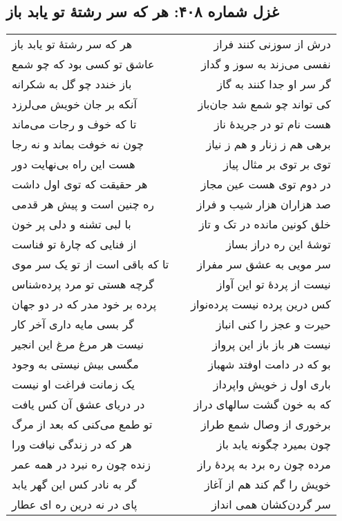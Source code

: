 \begin{center}
\section*{غزل شماره ۴۰۸: هر که سر رشتهٔ تو یابد باز}
\label{sec:408}
\begin{longtable}{l p{0.5cm} r}
هر که سر رشتهٔ تو یابد باز
&&
درش از سوزنی کنند فراز
\\
عاشق تو کسی بود که چو شمع
&&
نفسی می‌زند به سوز و گداز
\\
باز خندد چو گل به شکرانه
&&
گر سر او جدا کنند به گاز
\\
آنکه بر جان خویش می‌لرزد
&&
کی تواند چو شمع شد جان‌باز
\\
تا که خوف و رجات می‌ماند
&&
هست نام تو در جریدهٔ ناز
\\
چون نه خوفت بماند و نه رجا
&&
برهی هم ز زنار و هم ز نیاز
\\
هست این راه بی‌نهایت دور
&&
توی بر توی بر مثال پیاز
\\
هر حقیقت که توی اول داشت
&&
در دوم توی هست عین مجاز
\\
ره چنین است و پیش هر قدمی
&&
صد هزاران هزار شیب و فراز
\\
با لبی تشنه و دلی پر خون
&&
خلق کونین مانده در تک و تاز
\\
از فنایی که چارهٔ تو فناست
&&
توشهٔ این ره دراز بساز
\\
تا که باقی است از تو یک سر موی
&&
سر مویی به عشق سر مفراز
\\
گرچه هستی تو مرد پرده‌شناس
&&
نیست از پردهٔ تو این آواز
\\
پرده بر خود مدر که در دو جهان
&&
کس درین پرده نیست پرده‌نواز
\\
گر بسی مایه داری آخر کار
&&
حیرت و عجز را کنی انباز
\\
نیست هر مرغ مرغ این انجیر
&&
نیست هر باز باز این پرواز
\\
مگسی بیش نیستی به وجود
&&
بو که در دامت اوفتد شهباز
\\
یک زمانت فراغت او نیست
&&
باری اول ز خویش واپرداز
\\
در دریای عشق آن کس یافت
&&
که به خون گشت سالهای دراز
\\
تو طمع می‌کنی که بعد از مرگ
&&
برخوری از وصال شمع طراز
\\
هر که در زندگی نیافت ورا
&&
چون بمیرد چگونه یابد باز
\\
زنده چون ره نبرد در همه عمر
&&
مرده چون ره برد به پردهٔ راز
\\
گر به نادر کس این گهر یابد
&&
خویش را گم کند هم از آغاز
\\
پای در نه درین ره ای عطار
&&
سر گردن‌کشان همی انداز
\\
\end{longtable}
\end{center}
